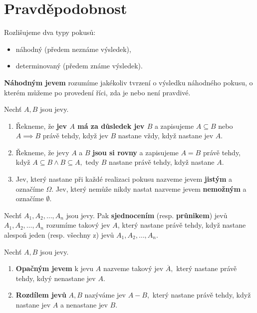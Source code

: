 \section{Pravděpodobnost}
\begin{pozn}
    Rozlišujeme dva typy pokusů:
   	\begin{itemize}
    \item náhodný (předem neznáme výsledek),
   	\item determinovaný (předem známe výsledek).
    \end{itemize}
\end{pozn}

\begin{definition}
    \textbf{Náhodným jevem} rozumíme jakékoliv tvrzení o výsledku náhodného pokusu,
    o kterém můžeme po provedení říci, zda je nebo není pravdivé.
\end{definition}

\begin{definition}
    Nechť $A,B$ jsou jevy.
    \begin{enumerate}[$i.$]
    \item Řekneme, že \textbf{jev $A$ má za důsledek jev $B$} a zapisujeme
    $A\subseteq B$ nebo $A\implies B$ právě tehdy, když jev $B$ nastane vždy, když
    nastane jev $A.$
   	\item Řekneme, že jevy $A$ a $B$ \textbf{jsou si rovny} a zapisujeme $A=B$ právě
    tehdy, když $A\subseteq B \land B\subseteq A,$ tedy $B$ nastane právě tehdy,
    když nastane $A.$
   	\item Jev, který nastane při každé realizaci pokusu nazveme jevem \textbf{jistým}
    a označíme $\Omega.$ Jev, který nemůže nikdy nastat nazveme jevem \textbf{nemožným}
    a označíme $\emptyset.$
    \end{enumerate}
\end{definition}

\begin{definition}
    Nechť $A_1, A_2, \dots, A_n$ jsou jevy. Pak \textbf{sjednocením} (resp. \textbf{
    průnikem}) jevů $A_1, A_2, \dots, A_n$ rozumíme takový jev $A$, který nastane
    právě tehdy, když nastane alespoň jeden (resp. všechny z) jevů $A_1, A_2,
    \dots, A_n$.
\end{definition}

\begin{definition}
    Nechť $A,B$ jsou jevy.
    \begin{enumerate}[$i.$]
    \item \textbf{Opačným jevem} k jevu $A$ nazveme takový jev $\overline A,$ který
    nastane právě tehdy, kdyý nenastane jev $A.$
   	\item \textbf{Rozdílem jevů} $A,B$ nazýváme jev $A-B,$ který nastane právě tehdy,
    když nastane jev $A$ a nenastane jev $B$.
    \end{enumerate}
\end{definition}


